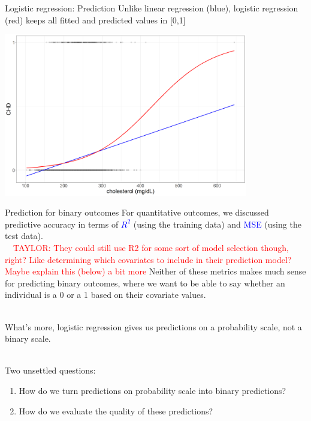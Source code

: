\documentclass[10pt,t]{beamer}
\begin{document}
\begin{frame}{Logistic regression: Prediction}
	Unlike linear regression (blue), logistic regression (red) keeps all fitted and predicted values in [0,1]
		\begin{center}
		\includegraphics[width=0.8\textwidth]{./figs/scatter_glm}
	\end{center}
\end{frame}

\begin{frame}{Prediction for binary outcomes}
	For quantitative outcomes, we discussed predictive accuracy in terms of \textcolor{blue}{$R^2$} (using the training data) and \textcolor{blue}{MSE} (using the test data). \pause
	\\ ~\
	\textcolor{red}{TAYLOR: They could still use R2 for some sort of model selection though, right? Like determining which covariates to include in their prediction model? Maybe explain this (below) a bit more}
	Neither of these metrics makes much sense for predicting binary outcomes, where we want to be able to say whether an individual is a 0 or a 1 based on their covariate values. \pause
	\\ ~\
	
	What's more, logistic regression gives us predictions on a probability scale, not a binary scale. \pause
	\\ ~\
	
	Two unsettled questions: 
	\begin{enumerate}
		\item How do we turn predictions on probability scale into binary predictions? \pause
		\item How do we evaluate the quality of these predictions? 
	\end{enumerate}
\end{frame}
\end{document}
